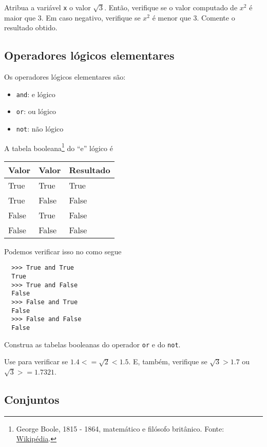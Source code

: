 \documentclass[12pt]{article}
\begin{document}
\begin{exr}
  Atribua a variável \lstinline+x+ o valor $\sqrt{3}$. Então, verifique se o valor computado de $x^2$ é maior que $3$. Em caso negativo, verifique se $x^2$ é menor que 3. Comente o resultado obtido.
\end{exr}

\subsection{Operadores lógicos elementares}

Os operadores lógicos elementares são:
\begin{itemize}
\item[]\lstinline+and+: e lógico
\item[]\lstinline+or+: ou lógico
\item[]\lstinline+not+: não lógico
\end{itemize}

A tabela booleana\footnote{George Boole, 1815 - 1864, matemático e filósofo britânico. Fonte: \href{https://pt.wikipedia.org/wiki/George\_Boole}{Wikipédia}.} do ``e'' lógico é
\begin{center}
  \begin{tabular}[H]{ll|l}
    Valor & Valor & Resultado \\\hline
    True & True & True \\
    True & False & False \\
    False & True & False \\
    False & False & False \\\hline
  \end{tabular}
\end{center}
Podemos verificar isso no {\python} como segue
\begin{lstlisting}
  >>> True and True
  True
  >>> True and False
  False
  >>> False and True
  False
  >>> False and False
  False
\end{lstlisting}

\begin{exr}
  Construa as tabelas booleanas do operador \lstinline+or+ e do \lstinline+not+.
\end{exr}

\begin{exr}
  Use {\python} para verificar se $1.4 <= \sqrt{2} < 1.5$. E, também, verifique se $\sqrt{3} > 1.7$ ou $\sqrt{3} >= 1.7321$.
\end{exr}

\subsection{Conjuntos}
\end{document}
